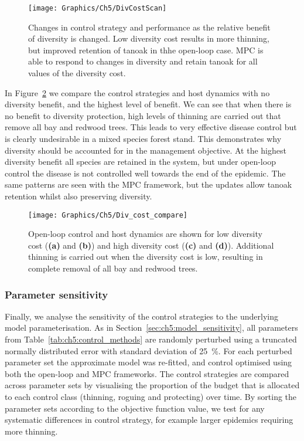 \begin{figure}
    \begin{center}
        \texttt{[image: Graphics/Ch5/DivCostScan]}
        \caption[Varying the diversity cost]{Changes in control strategy and performance as the relative benefit of diversity is changed. Low diversity cost results in more thinning, but improved retention of tanoak in thhe open-loop case. MPC is able to respond to changes in diversity and retain tanoak for all values of the diversity cost.\label{fig:ch5:div_scan}}
    \end{center}
\end{figure}

In Figure~\ref{fig:ch5:div_compare} we compare the control strategies and host dynamics with no diversity benefit, and the highest level of benefit. We can see that when there is no benefit to diversity protection, high levels of thinning are carried out that remove all bay and redwood trees. This leads to very effective disease control but is clearly undesirable in a mixed species forest stand. This demonstrates why diversity should be accounted for in the management objective. At the highest diversity benefit all species are retained in the system, but under open-loop control the disease is not controlled well towards the end of the epidemic. The same patterns are seen with the MPC framework, but the updates allow tanoak retention whilst also preserving diversity.

\begin{figure}[t]
    \begin{center}
        \texttt{[image: Graphics/Ch5/Div\_cost\_compare]}
        \caption[Host dynamics when varying the diversity cost]{Open-loop control and host dynamics are shown for low diversity cost (\textbf{(a)} and \textbf{(b)}) and high diversity cost (\textbf{(c)} and \textbf{(d)}). Additional thinning is carried out when the diversity cost is low, resulting in complete removal of all bay and redwood trees.\label{fig:ch5:div_compare}}
    \end{center}
\end{figure}

\subsubsection{Parameter sensitivity}

Finally, we analyse the sensitivity of the control strategies to the underlying model parameterisation. As in Section~\ref{sec:ch5:model_sensitivity}, all parameters from Table~\ref{tab:ch5:control_methods} are randomly perturbed using a truncated normally distributed error with standard deviation of \SI{25}{\percent}. For each perturbed parameter set the approximate model was re-fitted, and control optimised using both the open-loop and MPC frameworks. The control strategies are compared across parameter sets by visualising the proportion of the budget that is allocated to each control class (thinning, roguing and protecting) over time. By sorting the parameter sets according to the objective function value, we test for any systematic differences in control strategy, for example larger epidemics requiring more thinning.

